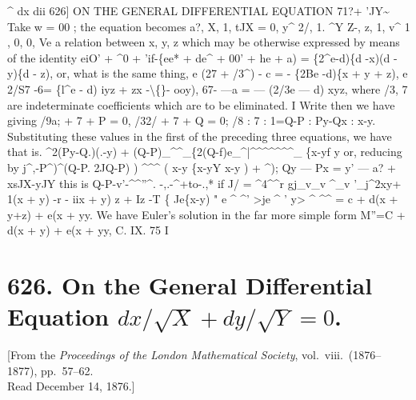 \documentclass[12pt,a4paper]{article}
\begin{document}
\textasciicircum{}
dx
dii
626]
ON THE GENERAL DIFFERENTIAL EQUATION 71?+ 'JY\textasciitilde{}
Take w = 00
;
the equation becomes
a?,
X,
1,
tJX
= 0,
y\textasciicircum{}
2/,
1.
\textasciicircum{}Y
Z-,
z,
1,
v\textasciicircum{}
1
,
0,
0,
Ve
a relation between
x,
y, z
which may be otherwise expressed by means of the
identity
eiO' + \textasciicircum{}0 + 'if-\{ee* + de\textasciicircum{} + 00' + he + a) = \{2\textasciicircum{}e-d)\{d -x)(d - y)\{d - z),
or, what
is the same
thing,
e (27 + /3\textasciicircum{}) - c = - \{2Be -d)\{x + y + z),
e
2/S7
-6=
\{l\textasciicircum{}e - d) iyz + zx
-\textbackslash\{\}- ooy),
67-
---a = --- (2/3e --- d) xyz,
where
/3, 7 are indeterminate
coefficients which are
to be
eliminated.
\textbullet{}I
Write
then we have
giving
/9a; + 7 + P = 0,
/32/ + 7 + Q = 0;
/8
: 7
: 1=Q-P
: Py-Qx
: x-y.
Substituting these values
in the
first of the preceding three
equations, we have
that
is.
\textasciicircum{}2(Py-Q.)(.-y) + (Q-P)\guillemotright{}\_\textasciicircum{}\textasciicircum{}\_\{2(Q-f)e\_\textasciicircum{}|\textasciicircum{}\textasciicircum{}\textasciicircum{}\textasciicircum{}\textasciicircum{}\textasciicircum{}\textasciicircum{}\_
\{x-yf
y
or, reducing by
j\textasciicircum{},-P\textasciicircum{})\textasciicircum{}(Q-P.
2JQ-P)
)
\textasciicircum{}\textasciicircum{}\textasciicircum{}
(
x-y
\{x-yY
x-y
)
+ \textasciicircum{});
Qy --- Px = y' --- a? + xsJX-yJY
this
is
Q-P-v'-\textasciicircum{}\textasciicircum{}''\textasciicircum{}.
-,.-\textasciicircum{}+to-.,*
if J/ = \textasciicircum{}4\textasciicircum{}\textasciicircum{}r
gj\_v\_v
\textasciicircum{}\_v
'\_j\textasciicircum{}2xy+
1(x + y) -r - iix + y) z + Iz
-T
\{
\guillemotright{}Je\{x-y)
"
e
\textasciicircum{}
\textasciicircum{}' >je
\textasciicircum{}
' y>
\textasciicircum{}
\textasciicircum{}\textasciicircum{}
= c + d(x + y+z) + e(x + yy.
We have
Euler's solution
in the
far more simple form
M''=C + d(x + y) + e(x + yy,
C.
IX.
75
I


\newpage
\section*{626. On the General Differential Equation $dx/\sqrt{X} + dy/\sqrt{Y} = 0$.}

\begin{center}
\small[From the \textit{Proceedings of the London Mathematical Society}, vol.~viii.\ (1876--1877), pp.~57--62.\\Read December 14, 1876.]
\end{center}
\end{document}

